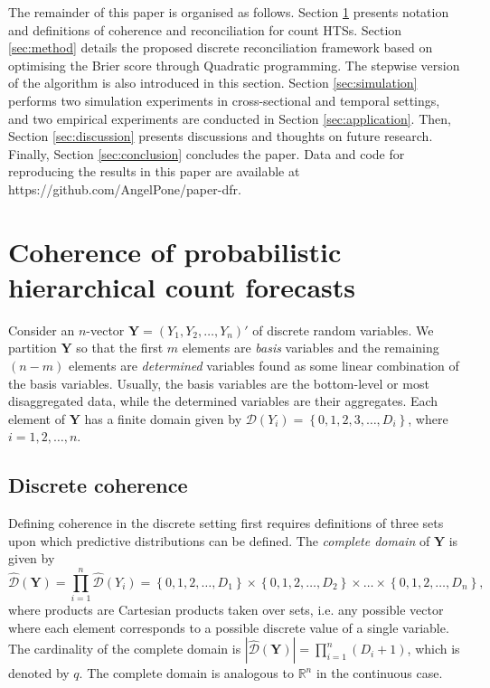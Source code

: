 \documentclass[a4paper,review,12pt,authoryear]{elsarticle}
\newcommand{\bY}{\mathbf{Y}}
\theoremstyle{definition}
\begin{document}
The remainder of this paper is organised as follows.
Section \ref{sec:coherence} presents notation and definitions of coherence and reconciliation for count HTSs.
Section \ref{sec:method} details the proposed discrete reconciliation framework based on optimising the Brier score through Quadratic programming. The stepwise version of the algorithm is also introduced in this section.
Section \ref{sec:simulation} performs two simulation experiments in cross-sectional and temporal settings, and two empirical experiments are conducted in Section \ref{sec:application}.
Then, Section \ref{sec:discussion} presents discussions and thoughts on future research. 
Finally, Section \ref{sec:conclusion} concludes the paper.
Data and code for reproducing the results in this paper are available at https://github.com/AngelPone/paper-dfr.



\section{Coherence of probabilistic hierarchical count forecasts}

\label{sec:coherence}


Consider an $n$-vector $\bY=\left(Y_1,Y_2,\ldots,Y_n\right)'$ of discrete random variables.
We partition $\bY$ so that the first $m$ elements are \textit{basis} variables and the remaining $(n-m)$ elements are \textit{determined} variables found as some linear combination of the basis variables. Usually, the basis variables are the bottom-level or most disaggregated data, while the determined variables are their aggregates.
Each element of $\bY$ has a finite domain given by $\mathcal{D}(Y_i)=\left\{0, 1,2,3,\dots,D_i\right\}$, where $i = 1, 2, \dots, n$.

\subsection{Discrete coherence}\label{sec:domains}

Defining coherence in the discrete setting first requires definitions of three sets upon which predictive distributions can be defined. The \textit{complete domain} of $\bY$ is given by
\[
\hat{\mathcal D}(\bY)=\prod\limits_{i=1}^n\hat{\mathcal D}(Y_i)=\left\{0, 1,2,\dots,D_1\right\}\times\left\{0,1,2,\dots,D_2\right\}\times\dots\times\left\{0,1,2,\dots,D_n\right\},
\]
where products are Cartesian products taken over sets, i.e. any possible vector where each element corresponds to a possible discrete value of a single variable.
The cardinality of the complete domain is $|\hat{\mathcal D}(\bY)|=\prod\limits_{i=1}^{n} (D_i+1)$, which is denoted by $q$.
The complete domain is analogous to $\mathbb{R}^n$ in the continuous case.
\end{document}
